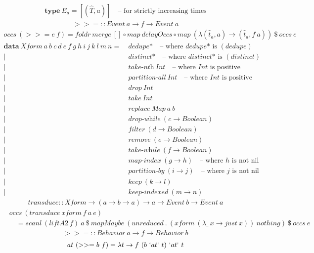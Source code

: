 \documentclass[fleqn]{amsart}
\newcommand{\zeroarity}[1]{&\ \textit{#1*}\quad\text{-- where }\textit{#1*}\text{ is }(#1)}
\newcommand{\positive}[1]{&\ \textit{#1}\ Int\quad\text{-- where }Int\text{ is positive}}
\newcommand{\integer}[1]{&\ #1\ Int}
\newcommand{\predicate}[2]{&\ \textit{#1}\ (#2 \rightarrow Boolean)}
\newcommand{\nonnillable}[3]{&\ \textit{#1}\ (#2 \rightarrow #3)\quad\text{-- where }#3\text{ is not nil}}
\newcommand{\any}[3]{&\ \textit{#1}\ (#2 \rightarrow #3)}
\begin{document}
\begin{align*}
  \mathbf{type}\ E_a = [(\hat{T}, a)]\quad\text{-- for strictly increasing times}
\end{align*}
\begin{align*}
  >>= :: Event\ a \rightarrow f \rightarrow Event\ a
\end{align*}
\begin{align*}
  occs\ (>>= e\ f) = foldr\ merge\ []\circ map\ delayOccs\circ map\ (\lambda(\hat{t}_a, a) \rightarrow (\hat{t}_a , f\ a))\ \$ \ occs\ e
\end{align*}
\begin{align*}
  \mathbf{data}\ Xform\ a\ b\ c\ d\ e\ f\ g\ h\ i\ j\ k\ l\ m\ n =\zeroarity{dedupe}\\
  |\zeroarity{distinct}\\
  |\positive{take-nth}\\
  |\positive{partition-all}\\
  |\integer{drop}\\
  |\integer{take}\\
  |&\ replace\ Map\ a\ b\\
  |\predicate{drop-while}{c}\\
  |\predicate{filter}{d}\\
  |\predicate{remove}{e}\\
  |\predicate{take-while}{f}\\
  |\nonnillable{map-index}{g}{h}\\
  |\nonnillable{partition-by}{i}{j}\\
  |\any{keep}{k}{l}\\
  |\any{keep-indexed}{m}{n}
\end{align*}
\begin{align*}
  transduce :: Xform \rightarrow (a \rightarrow b \rightarrow a) \rightarrow a \rightarrow Event\ b \rightarrow Event\ a
\end{align*}
\begin{align*}
  &occs\ (transduce\ xform\ f\ a\ e)\\
  &\quad= scanl\ (liftA2\ f)\ a\ \$\ mapMaybe\ (unreduced\ .\ (xform\ (\lambda\_\ x\rightarrow just\ x))\ nothing)\ \$\ occs\ e
\end{align*}
\begin{align*}
  >>= :: Behavior\ a \rightarrow f \rightarrow Behavior\ b
\end{align*}
\begin{align*}
  at\ (>>= b\ f) =\lambda t \rightarrow f\ (b\ `at` \ t)\ `at` \ t
\end{align*}
\end{document}
